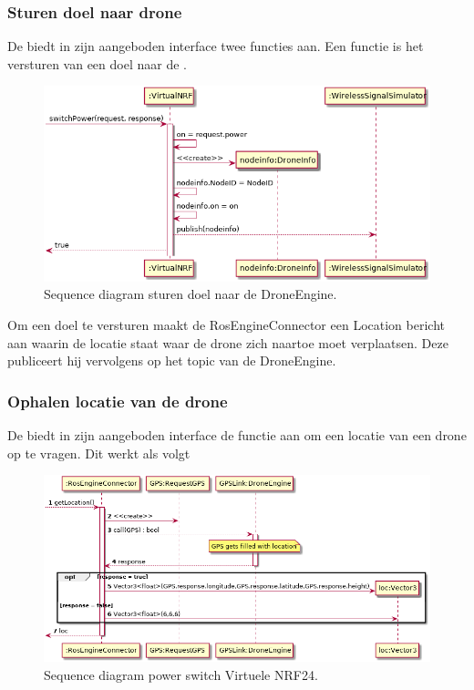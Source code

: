 \documentclass[a4paper, 11pt, oneside]{report}
\begin{document}
\subsubsection{Sturen doel naar drone}
\label{DetailedDesign:ros:sequence:sturendoelnaarengine}

De  biedt in zijn aangeboden interface twee functies aan.
Een functie is het versturen van een doel naar de . 

\begin{figure}[H]
	\begin{center}\includegraphics[width=.8\linewidth]{UML/out/ros/sequence/powerSwitch/powerSwitch.png}\end{center}
	\caption{Sequence diagram sturen doel naar de DroneEngine.}
	\label{fig:ros:sequence:sequence:sturendoelnaarengine}
\end{figure}

Om een doel te versturen maakt de RosEngineConnector een Location bericht aan waarin de locatie staat waar de drone zich naartoe moet verplaatsen.
Deze publiceert hij vervolgens op het topic van de DroneEngine.

\subsubsection{Ophalen locatie van de drone}
\label{DetailedDesign:ros:sequence:ophalenlocatie}

De  biedt in zijn aangeboden interface de functie aan om een locatie van een drone op te vragen. Dit werkt als volgt

\begin{figure}[H]
	\begin{center}\includegraphics[width=.9\linewidth]{UML/out/ros/sequence/getLocation/getLocation.png}\end{center}
	\caption{Sequence diagram power switch Virtuele NRF24.}
	\label{fig:ros:sequence:sequence:ophalenlocatie}
\end{figure}
\end{document}
